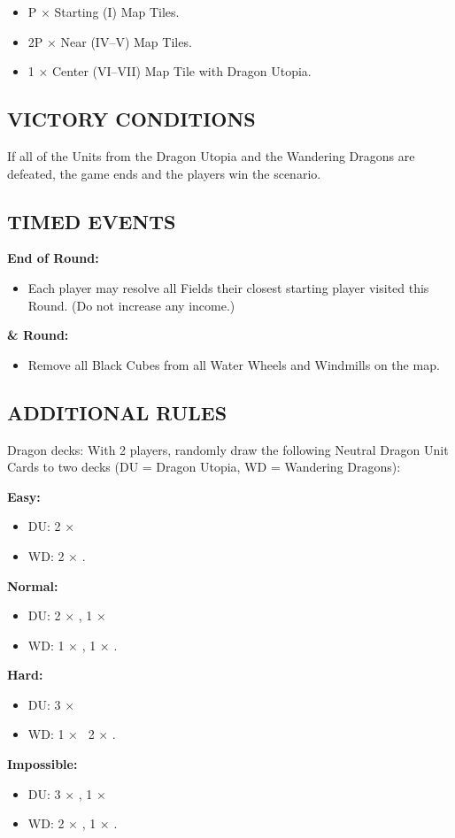 \begin{multicols*}{2}
\begin{itemize}
  \item P × Starting (I) Map Tiles.
  \item 2P × Near (IV–V) Map Tiles.
  \item 1 × Center (VI–VII) Map Tile with Dragon Utopia.
\end{itemize}

\subsection*{\MakeUppercase{Victory Conditions}}
If all of the Units from the Dragon Utopia and the Wandering Dragons are defeated, the game ends and the players win the scenario.

\subsection*{\MakeUppercase{Timed Events}}
\textbf{End of  Round:}
\begin{itemize}
  \item Each player may resolve all Fields their closest starting player visited this Round. (Do not increase any income.)
\end{itemize}
\textbf{ \&  Round:}
\begin{itemize}
  \item Remove all Black Cubes from all Water Wheels and Windmills on the map.
\end{itemize}

\subsection*{\MakeUppercase{Additional Rules}}
Dragon decks: With 2 players, randomly draw the following Neutral Dragon Unit Cards to two decks (DU = Dragon Utopia, WD = Wandering Dragons):

\textbf{Easy:}
\begin{itemize}
  \item DU: 2 × \azure
  \item WD: 2 × \golden.
\end{itemize}
\textbf{Normal:}
\begin{itemize}
  \item DU: 2 × \azure, 1 × \golden
  \item WD: 1 × \azure, 1 × \golden.
\end{itemize}
\textbf{Hard:}
\begin{itemize}
  \item DU: 3 × \azure
  \item WD: 1 × \azure\, 2 × \golden.
\end{itemize}
\textbf{Impossible:}
\begin{itemize}
  \item DU: 3 × \azure, 1 × \golden
  \item WD: 2 × \azure, 1 × \golden.
\end{itemize}


\end{multicols*}
